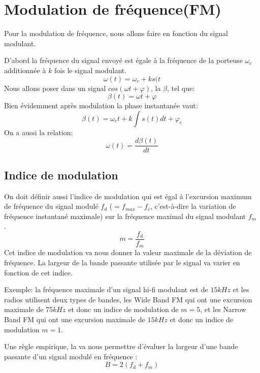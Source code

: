 \section{Modulation de fréquence(FM)}

Pour la modulation de fréquence, nous allons faire  en fonction du signal modulant.

D'abord la fréquence du signal envoyé est égale à la fréquence de la porteuse $\omega_c$ additionnée à $k$ fois le signal modulant.
\begin{equation*}
\omega (t) = \omega_c + ks(t
\end{equation*}
Nous allons poser dans un signal $cos(\omega t + \varphi)$, la  $\beta$, tel que:
\begin{equation*}
\beta (t) = \omega t + \varphi
\end{equation*}
Bien évidemment après modulation la phase instantanée vaut:
\begin{equation*}
\beta (t) = \omega_c t + k \int s(t) dt + \varphi_c
\end{equation*}
On a aussi la relation:
\begin{equation*}
\omega (t) = \frac{d\beta (t)}{dt}
\end{equation*}
\subsection{Indice de modulation}

On doit définir aussi l'indice de modulation qui est égal à l'excursion maximum de fréquence du signal modulé $f_d$ ($= f_{max} - f_c$, c'est-à-dire la variation de fréquence instantané maximale) sur la fréquence maximal du signal modulant $f_m$ .
\begin{equation*}
m = \frac{f_d}{f_m}
\end{equation*}
Cet indice de modulation va nous donner la valeur maximale de la déviation de fréquence. La largeur de la bande passante utilisée par le signal va varier en fonction de cet indice.

Exemple: la fréquence maximale d'un signal hi-fi modulant est de $15 kHz$ et les radios utilisent deux types de bandes, les Wide Band FM qui ont une excursion maximale de $75 kHz$ et donc un indice de modulation de $m=5$, et les Narrow Band FM qui ont une excursion maximale de $15 kHz$ et donc un indice de modulation $m=1$.

Une règle empirique, la  va nous permettre d'évaluer la largeur d'une bande passante d'un signal modulé en fréquence :
\begin{equation*}
B = 2(f_d + f_m)
\end{equation*}

